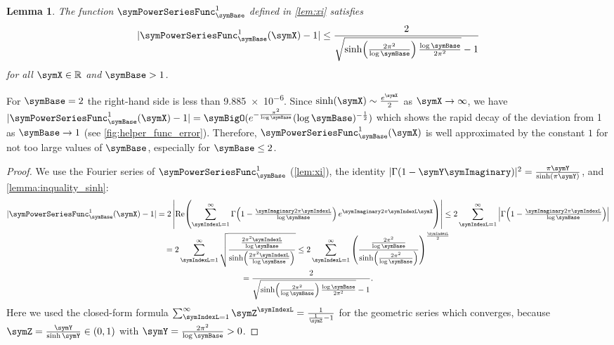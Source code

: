 \documentclass[sigconf, nonacm]{acmart}
\newtheorem{lemma}{Lemma}
\begin{document}
\begin{lemma}
\label{lem:xi1_approx}
The function $\symPowerSeriesFunc_\symBase^1$ defined in \cref{lem:xi} satisfies
\begin{equation*}
|\symPowerSeriesFunc_\symBase^1(\symX) - 1| \leq 
\frac{2}{\sqrt{
\sinh\!\left(\frac{2\pi^2}{\log \symBase}\right)
\frac{\log \symBase}{2\pi^2}
}
-1
}
\end{equation*}
for all $\symX\in\mathbb{R}$ and $\symBase>1$.
\end{lemma}
For $\symBase=2$ the right-hand side is less than \num{9.885e-6}. Since $\sinh(\symX) \sim \frac{e^\symX}{2}$ as $\symX\rightarrow\infty$, we have $|\symPowerSeriesFunc_\symBase^1(\symX) - 1| = \symBigO(e^{-\frac{\pi^2}{\log\symBase}}(\log\symBase)^{-\frac{1}{2}})$ which shows the rapid decay of the deviation from 1 as $\symBase\rightarrow 1$ (see \cref{fig:helper_func_error}). Therefore, $\symPowerSeriesFunc_\symBase^1(\symX)$ is well approximated 
by the constant $1$ for not too large values of $\symBase$, especially for $\symBase\leq 2$.
\begin{proof}
We use the Fourier series of $\symPowerSeriesFunc_\symBase^1$ (\cref{lem:xi}), the identity $|\Gamma(1-\symY\symImaginary)|^2 = \frac{\pi\symY}{\sinh(\pi\symY)}$, and \cref{lemma:inquality_sinh}:
\begin{multline*}
|\symPowerSeriesFunc_\symBase^1(\symX) - 1|
=
2\left|\operatorname{Re}\!\left(\sum_{\symIndexL=1}^\infty \Gamma\!\left(1 - \textstyle\frac{\symImaginary 2\pi \symIndexL}{\log \symBase}\right)e^{ \symImaginary 2\pi\symIndexL \symX}\right)\right|
\leq
2
\sum_{\symIndexL=1}^\infty
\left|
\Gamma\!\left(1 - \textstyle\frac{\symImaginary 2\pi \symIndexL}{\log \symBase}\right)
\right|
\\
=
2
\sum_{\symIndexL=1}^\infty
\sqrt{
\frac{\textstyle\frac{2\pi^2\symIndexL}{\log \symBase}}{\sinh\!\left(\textstyle\frac{2\pi^2  \symIndexL}{\log \symBase}\right)}
}
\leq
2
\sum_{\symIndexL=1}^\infty
\left(
\frac{\textstyle\frac{2\pi^2}{\log \symBase}}{\sinh\!\left(\textstyle\frac{2\pi^2}{\log \symBase}\right)}
\right)^\frac{\symIndexL}{2}
\\
=
\frac{2}{\sqrt{
\sinh\!\left(\frac{2\pi^2}{\log \symBase}\right)
\frac{\log \symBase}{2\pi^2}
}
-1
}.
\end{multline*}
Here we used the closed-form formula $\sum_{\symIndexL=1}^\infty \symZ^\symIndexL = \frac{1}{\frac{1}{\symZ}-1}$ for the geometric series which converges, because $\symZ=\frac{\symY}{\sinh\symY}\in(0,1)$ with $\symY = \frac{2\pi^2}{\log \symBase}>0$.
\end{proof}
\end{document}
